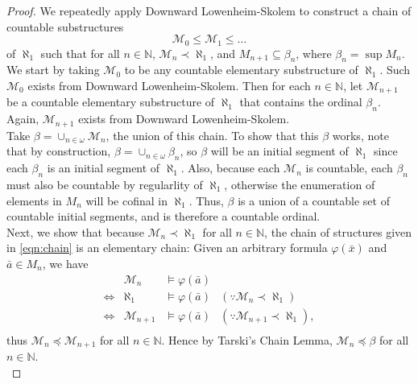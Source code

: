 \documentclass{article}
\begin{document}
\begin{enumerate}[label={\bf Q\arabic*:}]
\begin{enumerate}[label={\bf(\arabic*)}]
        \begin{proof}
          We repeatedly apply Downward Lowenheim-Skolem to construct a
          chain of countable substructures
          \begin{equation*}
            \tag{$**$}
            \mathcal{M}_0\leq \mathcal{M}_1\leq\ldots
            \label{eqn:chain}
          \end{equation*}
          of $\aleph_1$ such that for all $n\in\mathbb{N}$,
          $\mathcal{M}_n\prec\aleph_1$, and $M_{n+1}\subseteq\beta_n$,
          where $\beta_n=\sup M_n$. We start by taking $\mathcal{M}_0$ to
          be any countable elementary substructure of $\aleph_1$. Such
          $\mathcal{M}_0$ exists from Downward Lowenheim-Skolem. Then for
          each $n\in\mathbb{N}$, let $\mathcal{M}_{n+1}$ be a countable
          elementary substructure of $\aleph_1$ that contains the ordinal
          $\beta_n$. Again, $\mathcal{M}_{n+1}$ exists from Downward
          Lowenheim-Skolem. \\

          Take $\beta=\cup_{n\in\omega}\mathcal{M}_n$, the union of this
          chain. To show that this $\beta$ works, note that by
          construction, $\beta=\cup_{n\in\omega}\beta_n$, so $\beta$ will
          be an initial segment of $\aleph_1$ since each $\beta_n$ is an
          initial segment of $\aleph_1$. Also, because each $\mathcal{M}_n$
          is countable, each $\beta_n$ must also be countable by
          regularlity of $\aleph_1$, otherwise the enumeration of elements
          in $M_n$ will be cofinal in $\aleph_1$. Thus, $\beta$ is a union
          of a countable set of countable initial segments, and is
          therefore a countable ordinal. \\

          Next, we show that because $\mathcal{M}_n\prec\aleph_1$ for all
          $n\in\mathbb{N}$, the chain of structures given in
          \eqref{eqn:chain} is an elementary chain: Given an arbitrary
          formula $\varphi(\bar{x})$ and $\bar{a}\in M_n$, we have
          \[\begin{array}{crll}
            &\mathcal{M}_n &\models\varphi(\bar{a}) & \\
            \Leftrightarrow &\aleph_1 &\models\varphi(\bar{a})
              &(\because\mathcal{M}_n\prec\aleph_1) \\
            \Leftrightarrow &\mathcal{M}_{n+1} &\models\varphi(\bar{a})
              &(\because\mathcal{M}_{n+1}\prec\aleph_1), \\
          \end{array}\]
          thus $\mathcal{M}_n\preceq\mathcal{M}_{n+1}$ for all
          $n\in\mathbb{N}$. Hence by Tarski's Chain Lemma,
          $\mathcal{M}_n\preceq\beta$ for all $n\in\mathbb{N}$. \\


\end{proof}
\end{enumerate}
\end{enumerate}
\end{document}
